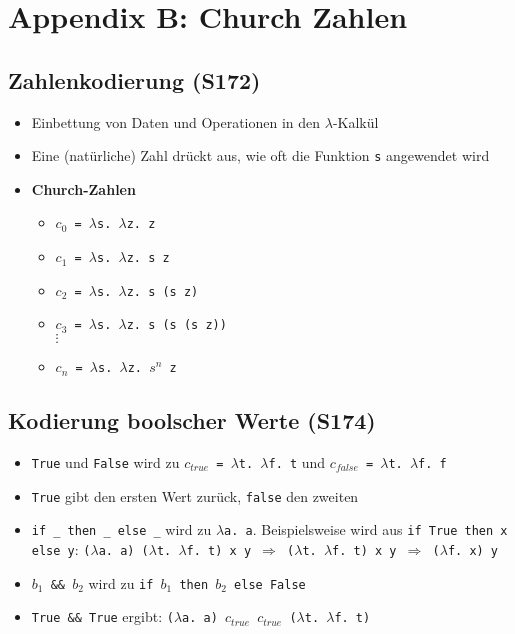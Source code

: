 \section{Appendix B: Church Zahlen}

\subsection{Zahlenkodierung (S172)}
\begin{itemize}
	\item Einbettung von Daten und Operationen in den \(\lambda\)-Kalkül
	\item Eine (natürliche) Zahl drückt aus, wie oft die Funktion \texttt{s} angewendet wird
	\item \textbf{Church-Zahlen}
	\begin{itemize}
		\item \texttt{\(c_0\) = \(\lambda\)s. \(\lambda\)z. z}
		\item \texttt{\(c_1\) = \(\lambda\)s. \(\lambda\)z. s z}
		\item \texttt{\(c_2\) = \(\lambda\)s. \(\lambda\)z. s (s z)}
		\item \texttt{\(c_3\) = \(\lambda\)s. \(\lambda\)z. s (s (s z))} \\ \(\vdots\)
		\item \texttt{\(c_n\) = \(\lambda\)s. \(\lambda\)z. \(s^n\) z}
	\end{itemize}
\end{itemize}


\subsection{Kodierung boolscher Werte (S174)}
\begin{itemize}
	\item \texttt{True} und \texttt{False} wird zu \texttt{\(c_{true}\) = \(\lambda\)t. \(\lambda\)f. t} und \texttt{\(c_{false}\) = \(\lambda\)t. \(\lambda\)f. f}
	\item \texttt{True} gibt den ersten Wert zurück, \texttt{false} den zweiten
	\item \texttt{if \_ then \_ else \_} wird zu \texttt{\(\lambda\)a. a}. Beispielsweise wird aus \texttt{if True then x else y}: \texttt{(\(\lambda\)a. a) (\(\lambda\)t. \(\lambda\)f. t) x y \(\Rightarrow\) (\(\lambda\)t. \(\lambda\)f. t) x y \(\Rightarrow\) (\(\lambda\)f. x) y}
	\item \texttt{\(b_1\) \&\& \(b_2\)} wird zu \texttt{if \(b_1\) then \(b_2\) else False}
	\item \texttt{True \&\& True} ergibt: \texttt{(\(\lambda\)a. a) \(c_{true}\) \(c_{true}\) (\(\lambda\)t. \(\lambda\)f. t)}
\end{itemize}


